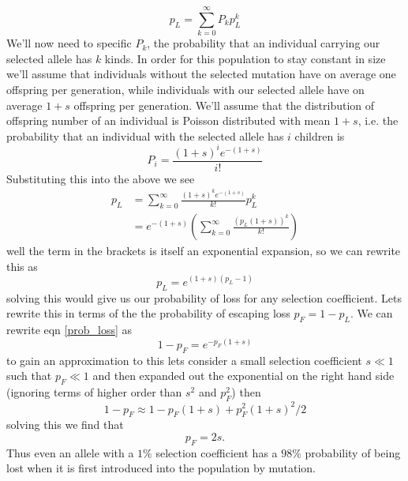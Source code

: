 \begin{equation}
  p_L = \sum_{k=0}^{\infty} P_k p_L^{k}
\end{equation}
We'll now need to specific $P_k$, the probability that an individual
carrying our selected allele has $k$ kinds. In order for this population to stay constant in size
we'll assume that individuals without the selected mutation have on average one
offspring per generation, while individuals with our selected allele
have on average $1+s$ offspring per generation. We'll assume that the
distribution of offspring number of an individual is Poisson
distributed with mean $1+s$, i.e. the probability that an individual
with the selected allele has $i$ children is
\begin{equation}
P_i= \frac{(1+s)^i e^{-(1+s)}}{i!}
\end{equation}
Substituting this into the above we see
  \begin{align}
p_L &=  \sum_{k=0}^{\infty} \frac{(1+s)^ke^{-(1+s)}}{k!} p_L^{k} \nonumber
\\
&= e^{-(1+s)} \left( \sum_{k=0}^{\infty} \frac{\left(p_L(1+s) \right)^k}{k!}  \right)
\end{align}
well the term in the brackets is itself an exponential expansion, so
we can rewrite this as
\begin{equation}
p_L = e^{(1+s)(p_L-1)} \label{prob_loss}
\end{equation}
solving this would give us our probability of loss for any selection
coefficient. Lets
rewrite this in terms of the the probability of escaping loss $p_F = 1-p_L$.  We can
rewrite eqn \eqref{prob_loss} as
\begin{equation}
1-p_F = e^{-p_F(1+s)}
\end{equation}
to gain an approximation to this lets consider a small selection
coefficient $s \ll 1$ such that $p_F \ll 1$ and then expanded out the
exponential on the right hand side (ignoring terms of higher
order than $s^2$ and $p_F^2$) then
\begin{equation}
1-p_F \approx 1-p_F(1+s)+p_F^2(1+s)^2/2
\end{equation}
solving this we find that
\begin{equation}
p_F = 2s.
\end{equation}
Thus even an allele with a $1\%$ selection coefficient has a $98\%$
probability of being lost when it is first introduced into the
population by mutation. \\

